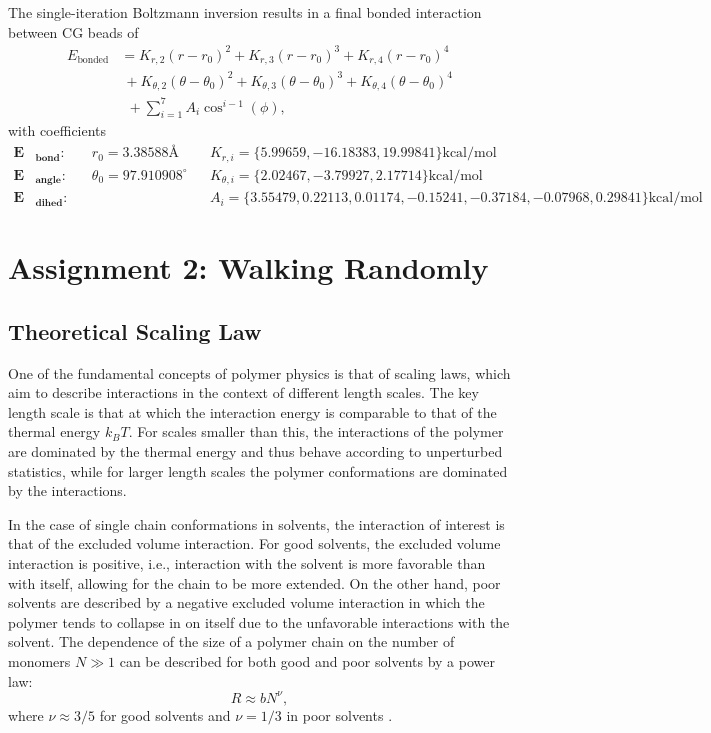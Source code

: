 \documentclass[10pt,a4paper]{labreport}
\begin{document}
  The single-iteration Boltzmann inversion results in a final bonded interaction between CG beads of
  \begin{equation}
    \begin{split}
      E_\text{bonded} &= K_{r,2}(r - r_0)^2 +   K_{r,3}(r - r_0)^3 +  K_{r,4}(r - r_0)^4 \\
                      &~+ K_{\theta,2}(\theta - \theta_0)^2 +   K_{\theta,3}(\theta - \theta_0)^3 +  K_{\theta,4}(\theta - \theta_0)^4  \\
                      &~~+ \sum_{i=1}^7 A_i \cos^{i-1}(\phi),
    \end{split}
    \label{eq:ass1_final_bondendEng}
  \end{equation}
  with coefficients
  \begin{align*}
    \bm{E}&_\textbf{bond}: && r_0 =  3.38588 \text{\AA} && K_{r,i} = \{5.99659, -16.18383, 19.99841\}\text{kcal/mol} \\
    \bm{E}&_\textbf{angle}: && \theta_0 =  97.910908 ^\circ&& K_{\theta,i} = \{2.02467, -3.79927, 2.17714\}\text{kcal/mol} \\
    \bm{E}&_\textbf{dihed}: && && A_i = \{3.55479, 0.22113, 0.01174, -0.15241, -0.37184, -0.07968, 0.29841\}\text{kcal/mol}
  \end{align*}



\newpage
\section{Assignment 2: Walking Randomly}
\subsection{Theoretical Scaling Law}
One of the fundamental concepts of polymer physics is that of scaling laws, which aim to describe interactions in the context of different length scales.
The key length scale is that at which the interaction energy is comparable to that of the thermal energy $k_BT$. 
For scales smaller than this, the interactions of the polymer are dominated by the thermal energy and thus behave according to unperturbed statistics, while for larger length scales the polymer conformations are dominated by the interactions.

In the case of single chain conformations in solvents, the interaction of interest is that of the excluded volume interaction. For good solvents, the excluded volume interaction is positive, i.e., interaction with the solvent is more favorable than with itself, allowing for the chain to be more extended. On the other hand, poor solvents are described by a negative excluded volume interaction in which the polymer tends to collapse in on itself due to the unfavorable interactions with the solvent. The dependence of the size of a polymer chain on the number of monomers $N \gg 1$ can be described for both good and poor solvents by a power law:
\begin{equation}
  R \approx b N^\nu,
\end{equation}
where $\nu \approx 3/5$ for good solvents and $\nu = 1/3$ in poor solvents \cite{rubinsteinPolymerPhysics2003}. 
\end{document}
